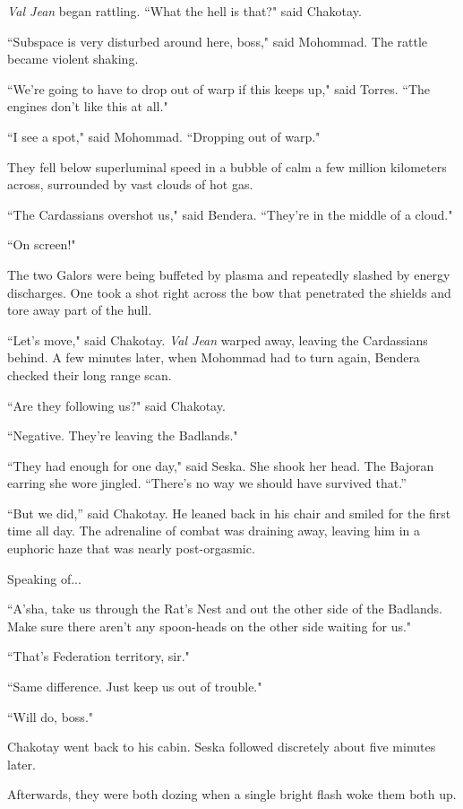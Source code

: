 \documentclass[twoside,letterpaper,12pt]{memoir}
\begin{document}
\textit{Val Jean} began rattling. ``What the hell is that?" said Chakotay.

``Subspace is very disturbed around here, boss," said Mohommad. The rattle became violent shaking.

``We're going to have to drop out of warp if this keeps up," said Torres. ``The engines don't like this at all."

``I see a spot," said Mohommad. ``Dropping out of warp."

They fell below superluminal speed in a bubble of calm a few million kilometers across, surrounded by vast clouds of hot gas.

``The Cardassians overshot us," said Bendera. ``They're in the middle of a cloud."

``On screen!"

The two Galors were being buffeted by plasma and repeatedly slashed by energy discharges. One took a shot right across the bow that penetrated the shields and tore away part of the hull.

``Let's move," said Chakotay. \textit{Val Jean} warped away, leaving the Cardassians behind. A few minutes later, when Mohommad had to turn again, Bendera checked their long range scan.

``Are they following us?" said Chakotay.

``Negative. They're leaving the Badlands."

``They had enough for one day," said Seska. She shook her head. The Bajoran earring she wore jingled. ``There's no way we should have survived that.''

``But we did,'' said Chakotay. He leaned back in his chair and smiled for the first time all day. The adrenaline of combat was draining away, leaving him in a euphoric haze that was nearly post-orgasmic.

Speaking of...

``A'sha, take us through the Rat's Nest and out the other side of the Badlands. Make sure there aren't any spoon-heads on the other side waiting for us."

``That's Federation territory, sir."

``Same difference. Just keep us out of trouble."

``Will do, boss."

Chakotay went back to his cabin. Seska followed discretely about five minutes later.

Afterwards, they were both dozing when a single bright flash woke them both up.
\end{document}
